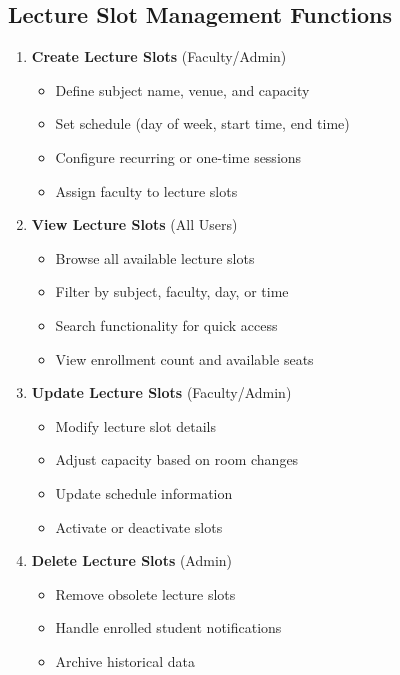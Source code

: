 \documentclass[12pt,a4paper]{report}
\begin{document}
\subsection{Lecture Slot Management Functions}

\begin{enumerate}[leftmargin=*]
    \item \textbf{Create Lecture Slots} (Faculty/Admin)
    \begin{itemize}
        \item Define subject name, venue, and capacity
        \item Set schedule (day of week, start time, end time)
        \item Configure recurring or one-time sessions
        \item Assign faculty to lecture slots
    \end{itemize}
    
    \item \textbf{View Lecture Slots} (All Users)
    \begin{itemize}
        \item Browse all available lecture slots
        \item Filter by subject, faculty, day, or time
        \item Search functionality for quick access
        \item View enrollment count and available seats
    \end{itemize}
    
    \item \textbf{Update Lecture Slots} (Faculty/Admin)
    \begin{itemize}
        \item Modify lecture slot details
        \item Adjust capacity based on room changes
        \item Update schedule information
        \item Activate or deactivate slots
    \end{itemize}
    
    \item \textbf{Delete Lecture Slots} (Admin)
    \begin{itemize}
        \item Remove obsolete lecture slots
        \item Handle enrolled student notifications
        \item Archive historical data
    \end{itemize}
\end{enumerate}
\end{document}
